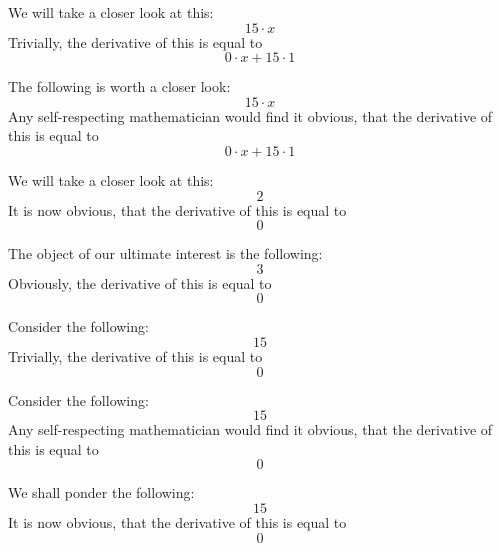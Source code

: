 \documentclass{article}
\begin{document}
We will take a closer look at this:
\begin{equation}
15 \cdot x 
\end{equation}
Trivially, the derivative of this is equal to
\begin{equation}
0 \cdot x + 15 \cdot 1 
\end{equation}

The following is worth a closer look:
\begin{equation}
15 \cdot x 
\end{equation}
Any self-respecting mathematician would find it obvious, that the derivative of this is equal to
\begin{equation}
0 \cdot x + 15 \cdot 1 
\end{equation}

We will take a closer look at this:
\begin{equation}
2 
\end{equation}
It is now obvious, that the derivative of this is equal to
\begin{equation}
0 
\end{equation}

The object of our ultimate interest is the following:
\begin{equation}
3 
\end{equation}
Obviously, the derivative of this is equal to
\begin{equation}
0 
\end{equation}

Consider the following:
\begin{equation}
15 
\end{equation}
Trivially, the derivative of this is equal to
\begin{equation}
0 
\end{equation}

Consider the following:
\begin{equation}
15 
\end{equation}
Any self-respecting mathematician would find it obvious, that the derivative of this is equal to
\begin{equation}
0 
\end{equation}

We shall ponder the following:
\begin{equation}
15 
\end{equation}
It is now obvious, that the derivative of this is equal to
\begin{equation}
0 
\end{equation}
\end{document}
